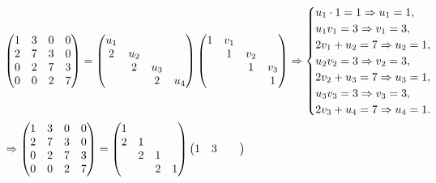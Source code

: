 \documentclass[hidelinks]{ctexart}
\begin{document}
\begin{align*}
    \hspace{-3em}& \begin{pmatrix}
        1 & 3 & 0 & 0 \\
        2 & 7 & 3 & 0 \\
        0 & 2 & 7 & 3 \\
        0 & 0 & 2 & 7
    \end{pmatrix} = \begin{pmatrix}
        u_1 & & & \\
        2 & u_2 & & \\
        & 2 & u_3 & \\
        & & 2 & u_4
    \end{pmatrix} \begin{pmatrix}
        1 & v_1 & & \\
        & 1 & v_2 & \\
        & & 1 & v_3 \\
        & & & 1
    \end{pmatrix} \Rightarrow \begin{cases}
    u_1\cdot 1 = 1 \Rightarrow u_1 = 1, \\
    u_1 v_1 = 3 \Rightarrow v_1 = 3, \\
    2v_1 + u_2 = 7 \Rightarrow u_2 = 1, \\
    u_2 v_2 = 3 \Rightarrow v_2 = 3, \\
    2v_2 + u_3 = 7 \Rightarrow u_3 = 1, \\
    u_3 v_3 = 3 \Rightarrow v_3 = 3, \\
    2v_3 + u_4 = 7 \Rightarrow u_4 = 1.
\end{cases} \\
\hspace{-3em}& \Rightarrow \begin{pmatrix}
        1 & 3 & 0 & 0 \\
        2 & 7 & 3 & 0 \\
        0 & 2 & 7 & 3 \\
        0 & 0 & 2 & 7
    \end{pmatrix} = \begin{pmatrix}
        1 & & & \\
        2 & 1 & & \\
        & 2 & 1 & \\
        & & 2 & 1
    \end{pmatrix} \begin{pmatrix}
        1 & 3 & & \\

\end{pmatrix}
\end{align*}
\end{document}
